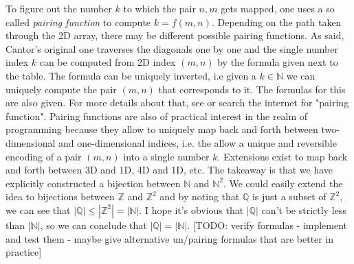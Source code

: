 To figure out the number $k$ to which the pair $n,m$ gets mapped, one uses a so called \emph{pairing function} to compute $k = f(m,n)$. Depending on the path taken through the 2D array, there may be different possible pairing functions. As said, Cantor's original one traverses the diagonals one by one and the single number index $k$ can be computed from 2D index $(m,n)$ by the formula given next to the table. The formula can be uniquely inverted, i.e given a $k \in \mathbb{N}$ we can uniquely compute the pair $(m,n)$ that corresponds to it. The formulas for this are also given. For more details about that, see \cite{WK_PairingFunction} or search the internet for "pairing function". Pairing functions are also of practical interest in the realm of programming because they allow to uniquely map back and forth between two-dimensional and one-dimensional indices, i.e. the allow a unique and reversible encoding of a pair $(m,n)$ into a single number $k$. Extensions exist to map back and forth between 3D and 1D, 4D and 1D, etc. The takeaway is that we have explicitly constructed a bijection between $\mathbb{N}$ and $\mathbb{N}^2$. We could easily extend the idea to bijections between $\mathbb{Z}$ and $\mathbb{Z}^2$ and by noting that $\mathbb{Q}$ is just a subset of $\mathbb{Z}^2$, we can see that $|\mathbb{Q}| \leq |\mathbb{Z}^2| = |\mathbb{N}|$. I hope it's obvious that $|\mathbb{Q}|$ can't be strictly less than $|\mathbb{N}|$, so we can conclude that $|\mathbb{Q}| = |\mathbb{N}|$. [TODO: verify formulas - implement and test them - maybe give alternative un/pairing formulas that are better in practice]


